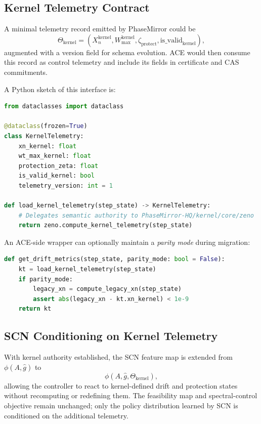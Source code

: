 \documentclass[11pt]{article}
\begin{document}
\subsection{Kernel Telemetry Contract}

A minimal telemetry record emitted by PhaseMirror could be
\[
\Theta_{\mathrm{kernel}} = \left(
  X_n^{\mathrm{kernel}},
  W_{\max}^{\mathrm{kernel}},
  \zeta_{\mathrm{protect}},
  \mathrm{is\_valid}_{\mathrm{kernel}}
\right),
\]
augmented with a version field for schema evolution. ACE would then consume this record as control telemetry and include its fields in certificate and CAS commitments.

A Python sketch of this interface is:

\begin{lstlisting}[style=code,language=Python]
from dataclasses import dataclass

@dataclass(frozen=True)
class KernelTelemetry:
    xn_kernel: float
    wt_max_kernel: float
    protection_zeta: float
    is_valid_kernel: bool
    telemetry_version: int = 1

def load_kernel_telemetry(step_state) -> KernelTelemetry:
    # Delegates semantic authority to PhaseMirror-HQ/kernel/core/zeno
    return zeno.compute_kernel_telemetry(step_state)
\end{lstlisting}

An ACE-side wrapper can optionally maintain a \emph{parity mode} during migration:

\begin{lstlisting}[style=code,language=Python]
def get_drift_metrics(step_state, parity_mode: bool = False):
    kt = load_kernel_telemetry(step_state)
    if parity_mode:
        legacy_xn = compute_legacy_xn(step_state)
        assert abs(legacy_xn - kt.xn_kernel) < 1e-9
    return kt
\end{lstlisting}

\subsection{SCN Conditioning on Kernel Telemetry}

With kernel authority established, the SCN feature map is extended from \(\phi(A,\hat g)\) to
\[
\phi(A,\hat g, \Theta_{\mathrm{kernel}}),
\]
allowing the controller to react to kernel-defined drift and protection states without recomputing or redefining them. The feasibility map and spectral-control objective remain unchanged; only the policy distribution learned by SCN is conditioned on the additional telemetry.
\end{document}
